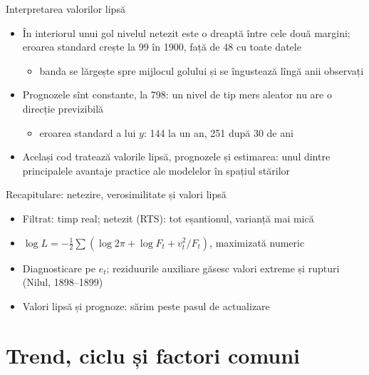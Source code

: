 \begin{frame}{Interpretarea valorilor lipsă}
\itemsize{\small}
\begin{itemize}
    \item În interiorul unui gol nivelul netezit este o dreaptă între cele două margini; eroarea standard crește la 99 în 1900, față de 48 cu toate datele
    \begin{itemize}
        \item banda se lărgește spre mijlocul golului și se îngustează lîngă anii observați
    \end{itemize}
    \item Prognozele sînt constante, la 798: un nivel de tip mers aleator nu are o direcție previzibilă
    \begin{itemize}
        \item eroarea standard a lui $y$: 144 la un an, 251 după 30 de ani
    \end{itemize}
    \item Același cod tratează valorile lipsă, prognozele și estimarea: unul dintre principalele avantaje practice ale modelelor în spațiul stărilor
\end{itemize}
\end{frame}

\begin{frame}{Recapitulare: netezire, verosimilitate și valori lipsă}
\itemsize{\small}
\begin{itemize}
    \item Filtrat: timp real; netezit (RTS): tot eșantionul, varianță mai mică
    \item $\log L = -\frac12\sum(\log 2\pi + \log F_t + v_t^2/F_t)$, maximizată numeric
    \item Diagnosticare pe $e_t$; reziduurile auxiliare găsesc valori extreme și rupturi (Nilul, 1898--1899)
    \item Valori lipsă și prognoze: sărim peste pasul de actualizare
\end{itemize}
\end{frame}


\section{Trend, ciclu și factori comuni}

